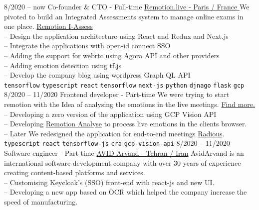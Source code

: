 \documentclass[9pt]{developercv}
\begin{document}
\begin{entrylist}
	\entry
	{8/2020 -- now}
	{Co-founder \& CTO - Full-time}
	{\href{https://remotion.live/}{Remotion.live - Paris / France }}
	{We pivoted to build an Integrated Assessments system to manage online exams in one place.
		\href{https://remotion.live/} {Remotion I-Assess} \\
		-- Design the application architecture using React and Redux and Next.js \\
		-- Integrate the applications with open-id connect SSO \\
		-- Adding the support for webrtc using Agora API and other providers \\
		-- Adding emotion detection using tf.js \\
		-- Develop the company blog using wordpress Graph QL API \\
		\texttt{tensorflow}\slashsep
		\texttt{typescript}\slashsep
		\texttt{react}\slashsep
		\texttt{tensorflow}\slashsep
		\texttt{next-js}\slashsep
		\texttt{python}\slashsep
		\texttt{djnago}\slashsep
		\texttt{flask}\slashsep
		\texttt{gcp}\slashsep
	}
	\entry
	{8/2020 -- 11/2020}
	{Frontend developer - Part-time}
	{}
	{We were trying to start remotion with the Idea of analysing the emotions in the live meetings.
		\href{https://remotion.live/} {Find more.} \\
		-- Developing a zero version of the application using GCP Vision API \\
		-- Developing \href{https://analyse.remotion.live/} {Remotion Analyse} to process live emotions in the clients browser. \\
		-- Later We redesigned the application for end-to-end meetings \href{https://radious.fr/} {Radious}. \\
		\texttt{typescript}\slashsep
		\texttt{react}\slashsep
		\texttt{tensorflow-js}\slashsep
		\texttt{cra}\slashsep
		\texttt{gcp-vision-api}\slashsep
	}
	\entry
	{8/2020 -- 11/2020}
	{Software engineer - Part-time}
	{
		\href{https://www.linkedin.com/company/avid-technology-development/}{AVID Arvand - Tehran / Iran}}
	{
		AvidArvand is an international software development company with over 30 years of experience creating content-based platforms and services. \\
		-- Customising Keycloak's (SSO) front-end with react-js and new UI. \\
		-- Developing a new app based on OCR which helped
		the company increase the speed of manufacturing. \\
}
\end{entrylist}
\end{document}
